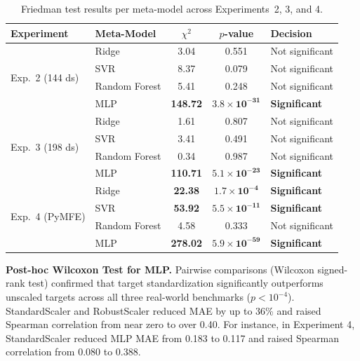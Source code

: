 \documentclass[12pt]{article}
\begin{document}
\begin{table}[ht]
\centering
\caption{Friedman test results per meta-model across Experiments~2, 3, and 4.}
\label{tab:friedman_all}
\footnotesize
\begin{tabular}{llccl}
\toprule
\textbf{Experiment} & \textbf{Meta-Model} & \textbf{$\chi^2$} & \textbf{$p$-value} & \textbf{Decision} \\
\midrule
\multirow{4}{*}{Exp.~2 (144 ds)}
 & Ridge        & 3.04            & 0.551                                    & Not significant \\
 & SVR          & 8.37            & 0.079                                    & Not significant \\
 & Random Forest & 5.41           & 0.248                                    & Not significant \\
 & MLP          & \textbf{148.72} & $\mathbf{3.8 \times 10^{-31}}$          & \textbf{Significant} \\
\midrule
\multirow{4}{*}{Exp.~3 (198 ds)}
 & Ridge        & 1.61            & 0.807                                    & Not significant \\
 & SVR          & 3.41            & 0.491                                    & Not significant \\
 & Random Forest & 0.34           & 0.987                                    & Not significant \\
 & MLP          & \textbf{110.71} & $\mathbf{5.1 \times 10^{-23}}$          & \textbf{Significant} \\
\midrule
\multirow{4}{*}{Exp.~4 (PyMFE)}
 & Ridge        & \textbf{22.38}  & $\mathbf{1.7 \times 10^{-4}}$           & \textbf{Significant} \\
 & SVR          & \textbf{53.92}  & $\mathbf{5.5 \times 10^{-11}}$          & \textbf{Significant} \\
 & Random Forest & 4.58           & 0.333                                    & Not significant \\
 & MLP          & \textbf{278.02} & $\mathbf{5.9 \times 10^{-59}}$          & \textbf{Significant} \\
\bottomrule
\end{tabular}
\end{table}

\textbf{Post-hoc Wilcoxon Test for MLP.} Pairwise comparisons (Wilcoxon signed-rank test) confirmed that target standardization significantly outperforms unscaled targets across all three real-world benchmarks ($p < 10^{-4}$). StandardScaler and RobustScaler reduced MAE by up to 36\% and raised Spearman correlation from near zero to over 0.40. For instance, in Experiment 4, StandardScaler reduced MLP MAE from 0.183 to 0.117 and raised Spearman correlation from 0.080 to 0.388.
\end{document}
